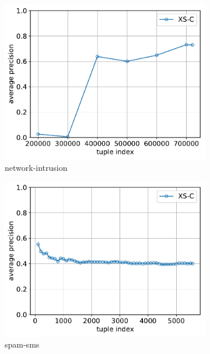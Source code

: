 \documentclass[11pt,onecolumn]{article}
\begin{document}
\begin{figure}[ht!]
    \centering
    \begin{subfigure}[t]{0.24\textwidth}
        \centering
        \includegraphics[width=\linewidth]{fig/http_ap_over_time.pdf}
        \caption{network-intrusion}
    \end{subfigure}
    \hfill
    \begin{subfigure}[t]{0.24\textwidth}
        \centering
        \includegraphics[width=\linewidth]{fig/sms_ap_over_time.pdf}
        \caption{spam-sms}
    \end{subfigure}
		\hfill
    \begin{subfigure}[t]{0.24\textwidth}

\end{subfigure}
\end{figure}
\end{document}
